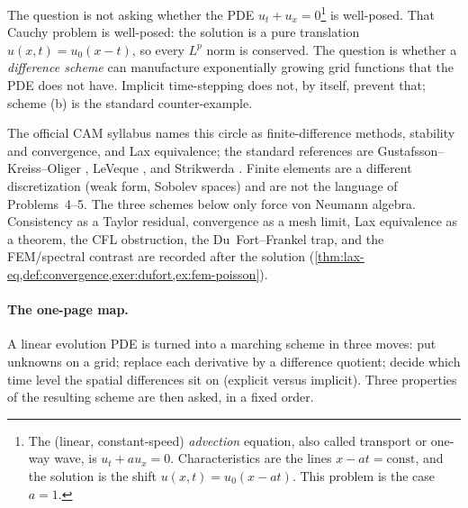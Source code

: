 \documentclass[11pt,a4paper]{article}
\begin{document}
The question is not asking whether the PDE \(u_t+u_x=0\)\footnote{The (linear, constant-speed) \emph{advection} equation, also called transport or one-way wave, is \(u_t+a u_x=0\). Characteristics are the lines \(x-at=\mathrm{const}\), and the solution is the shift \(u(x,t)=u_0(x-at)\). This problem is the case \(a=1\).} is well-posed. That Cauchy problem is well-posed: the solution is a pure translation \(u(x,t)=u_0(x-t)\), so every \(L^p\) norm is conserved. The question is whether a \emph{difference scheme} can manufacture exponentially growing grid functions that the PDE does not have. Implicit time-stepping does not, by itself, prevent that; scheme (b) is the standard counter-example.

The official CAM syllabus names this circle as finite-difference methods, stability and convergence, and Lax equivalence; the standard references are Gustafsson--Kreiss--Oliger \cite{gko95}, LeVeque \cite{leveque07}, and Strikwerda \cite{strikwerda04}. Finite elements \cite{brennerscott10} are a different discretization (weak form, Sobolev spaces) and are not the language of Problems~4--5. The three schemes below only force von Neumann algebra. Consistency as a Taylor residual, convergence as a mesh limit, Lax equivalence as a theorem, the CFL obstruction, the Du~Fort--Frankel trap, and the FEM/spectral contrast are recorded after the solution (\cref{thm:lax-eq,def:convergence,exer:dufort,ex:fem-poisson}).

\paragraph{The one-page map.}

A linear evolution PDE is turned into a marching scheme in three moves: put unknowns on a grid; replace each derivative by a difference quotient; decide which time level the spatial differences sit on (explicit versus implicit). Three properties of the resulting scheme are then asked, in a fixed order.

\begin{center}
\end{center}
\end{document}
